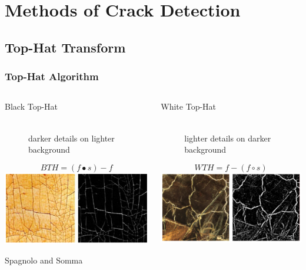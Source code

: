 \documentclass{beamer}
\begin{document}
\section[Methods of Crack Detection]{Methods of Crack Detection}

\subsection[Top-Hat Transform]{Top-Hat Transform}

\begin{frame}
\frametitle{Top-Hat Algorithm}
\begin{columns}
\begin{column}{0.5\textwidth}
\begin{description}
\item[Black Top-Hat] \hfill \\ darker details on lighter background
\end{description}
\begin{equation*}
BTH = (f \bullet s) - f
\end{equation*}
\includegraphics[width=1\textwidth]{black_top_hat}
\begin{center}
{\tiny Spagnolo and Somma}
\end{center}
\end{column}
\begin{column}{0.5\textwidth}
\begin{description}
\item[White Top-Hat] \hfill \\ lighter details on darker background
\end{description}
\begin{equation*}
WTH = f - (f \circ s)
\end{equation*}
\includegraphics[width=1\textwidth]{white_top_hat}

\end{column}
\end{columns}
\end{frame}
\end{document}
